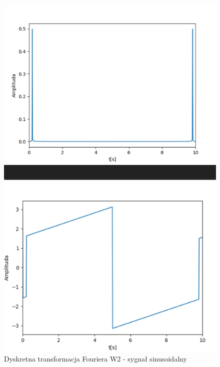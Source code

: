 \documentclass[12pt]{article}
\begin{document}
\begin{figure}[H]
\centering
\includegraphics[scale=0.6]{sinusDyskrW2.png}
\caption{Dyskretna transformacja Fouriera W2 - sygnał sinusoidalny}
\end{figure} 
\end{document}
